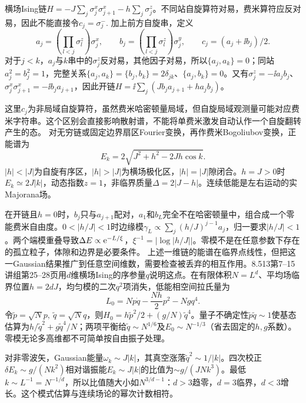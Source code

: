 \label{ch:ising}
横场Ising链$H=-J\sum_j\sigma_j^x\sigma_{j+1}^x-h\sum_j\sigma_j^z$。不同站自旋算符对易，费米算符应反对易，因此不能直接令$c_j=\sigma_j^-$. 加上前方自旋串，定义
\begin{equation}
a_j=\left(\prod_{l<j}\sigma_l^z\right)\sigma_j^x,\qquad b_j=\left(\prod_{l<j}\sigma_l^z\right)\sigma_j^y,\qquad c_j=(a_j+\ii b_j)/2.
\end{equation}
对于$j<k$，$a_j$与$k$串中的$\sigma_j^z$反对易，其他因子对易，所以$\{a_j,a_k\}=0$；同站$a_j^2=b_j^2=1$，完整关系$\{a_j,a_k\}=\{b_j,b_k\}=2\delta_{jk}$、$\{a_j,b_k\}=0$。又有$\sigma_j^z=-\ii a_jb_j$、$\sigma_j^x\sigma_{j+1}^x=-\ii b_ja_{j+1}$，因此开链$H=\ii\sum_j(Jb_ja_{j+1}+ha_jb_j)$。

这里$c_j$为非局域自旋算符，虽然费米哈密顿量局域，但自旋局域观测量可能对应费米字符串。这个区别会直接影响散射谱，不能将单费米激发自动认作一个自旋翻转产生的态。
对无穷链或固定边界扇区Fourier变换，再作费米Bogoliubov变换，正能谱为
\begin{equation}
E_k=2\sqrt{J^2+h^2-2Jh\cos k}.
\end{equation}
$|h|<|J|$为自旋有序区，$|h|>|J|$为横场极化区，$|h|=|J|$隙闭合。$h=J>0$时$E_k\simeq2J|k|$，动态指数$z=1$，非临界质量$\Delta=2|J-h|$。连续低能是左右运动的实Majorana场。

在开链且$h=0$时，$b_j$只与$a_{j+1}$配对，$a_1$和$b_L$完全不在哈密顿量中，组合成一个零能费米自由度。$0<|h/J|<1$时边缘模$\gamma_L\propto\sum_j(h/J)^{j-1}a_j$，归一要求$|h/J|<1$。两个端模重叠导致$\Delta E\propto\mathrm e^{-L/\xi}$，$\xi^{-1}=|\log|h/J||$。零模不是在任意参数下存在的孤立粒子，体隙和边界是必要条件。
上述一维链的能谱在临界点线性，但把这一Gaussian结果推广到任意空间维数，需要检查被丢弃的相互作用。8.513第7--15讲组第25--28页用$d$维横场Ising的序参量$q$说明这点。在有限体积$N=L^d$、平均场临界位置$h=2dJ$，均匀模的二次$q^2$项消失，低能相空间拉氏量为
\begin{equation}
L_0=Np\dot q-\frac{Nh}{2}p^2-Ngq^4.
\end{equation}
令$\widetilde p=\sqrt Np,\ \widetilde q=\sqrt Nq$，则$H_0=h\widetilde p^2/2+(g/N)\widetilde q^4$。量子不确定性$\widetilde p\widetilde q\sim1$使基态估算为$h/\widetilde q^2+g\widetilde q^4/N$；两项平衡给$\widetilde q\sim N^{1/6}$及$E_0\sim N^{-1/3}$（省去固定的$h,g$系数）。零模无论多高维都不可简单按自由振子处理。

对非零波矢，Gaussian能量$\omega_k\sim J|k|$，其真空涨落$\widetilde q^2\sim1/|k|$。四次校正$\delta E_k\sim g/(Nk^2)$相对谐振能$E_k\sim J|k|$的比值为$\sim g/(JNk^3)$。最低$k\sim L^{-1}=N^{-1/d}$，所以比值随大小如$N^{3/d-1}$：$d>3$趋零，$d=3$临界，$d<3$增长。这个模式估算与连续场论的幂次计数相符。

